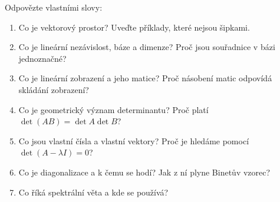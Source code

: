 \begin{problem}
  Odpovězte vlastními slovy:
  \begin{enumerate}
    \item Co je vektorový prostor? Uveďte příklady, které nejsou šipkami.
    \item Co je lineární nezávislost, báze a dimenze? Proč jsou souřadnice v bázi jednoznačné?
    \item Co je lineární zobrazení a jeho matice? Proč násobení matic odpovídá skládání zobrazení?
    \item Co je geometrický význam determinantu? Proč platí $\det(AB) = \det A\det B$?
    \item Co jsou vlastní čísla a vlastní vektory? Proč je hledáme pomocí $\det(A - \lambda I) = 0$?
    \item Co je diagonalizace a k čemu se hodí? Jak z ní plyne Binetův vzorec?
    \item Co říká spektrální věta a kde se používá?
  \end{enumerate}
\end{problem}
